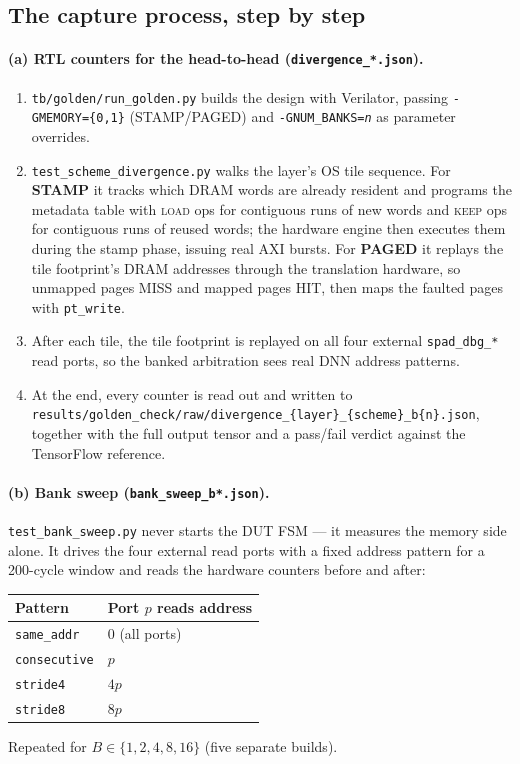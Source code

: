 \documentclass[11pt,a4paper]{article}
\newcommand{\op}[1]{\textsc{#1}}
\newcommand{\file}[1]{\texttt{\small #1}}
\begin{document}
\subsection{The capture process, step by step}

\paragraph{(a) RTL counters for the head-to-head (\file{divergence\_*.json}).}
\begin{enumerate}[leftmargin=1.5em,itemsep=2pt]
  \item \file{tb/golden/run\_golden.py} builds the design with Verilator,
        passing \file{-GMEMORY=\{0,1\}} (STAMP/PAGED) and
        \file{-GNUM\_BANKS=\textit{n}} as parameter overrides.
  \item \file{test\_scheme\_divergence.py} walks the layer's OS tile sequence.
        For \textbf{STAMP} it tracks which DRAM words are already resident and
        programs the metadata table with \op{load} ops for contiguous runs of
        new words and \op{keep} ops for contiguous runs of reused words; the
        hardware engine then executes them during the stamp phase, issuing real
        AXI bursts. For \textbf{PAGED} it replays the tile footprint's DRAM
        addresses through the translation hardware, so unmapped pages MISS and
        mapped pages HIT, then maps the faulted pages with \file{pt\_write}.
  \item After each tile, the tile footprint is replayed on all four external
        \file{spad\_dbg\_*} read ports, so the banked arbitration sees real DNN
        address patterns.
  \item At the end, every counter is read out and written to
        \file{results/golden\_check/raw/divergence\_\{layer\}\_\{scheme\}\_b\{n\}.json},
        together with the full output tensor and a pass/fail verdict against
        the TensorFlow reference.
\end{enumerate}

\paragraph{(b) Bank sweep (\file{bank\_sweep\_b*.json}).}
\file{test\_bank\_sweep.py} never starts the DUT FSM --- it measures the memory
side alone. It drives the four external read ports with a fixed address pattern
for a 200-cycle window and reads the hardware counters before and after:
\begin{center}\small
\begin{tabular}{@{}ll@{}}
\toprule
\textbf{Pattern} & \textbf{Port $p$ reads address} \\
\midrule
\file{same\_addr}   & 0 (all ports) \\
\file{consecutive}  & $p$ \\
\file{stride4}      & $4p$ \\
\file{stride8}      & $8p$ \\
\bottomrule
\end{tabular}
\end{center}
Repeated for $B \in \{1,2,4,8,16\}$ (five separate builds).
\end{document}

